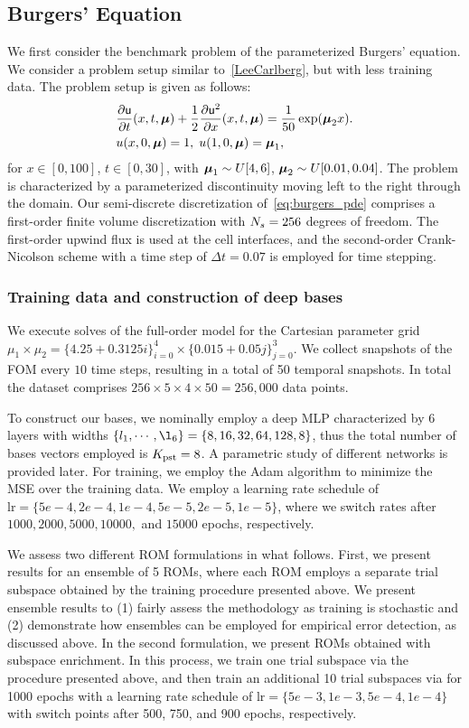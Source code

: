 \documentclass[3p,computermodern,10pt]{elsarticle}
\begin{document}
\subsection{Burgers' Equation}
We first consider the benchmark problem of the parameterized Burgers' equation. We consider a problem setup similar to~\ref{LeeCarlberg}, but with less training data. The problem setup is given as follows: 
\begin{align*}\label{eq:burgers_pde}
&\frac{\partial \mathsf{u}}{\partial t}(x,t,\boldsymbol \mu) + \frac{1}{2} \frac{\partial \mathsf{u}^2}{\partial x}(x,t,\boldsymbol \mu) = \frac{1}{50} \exp(\boldsymbol \mu_2 x). \\
&u(x,0,\boldsymbol \mu) = 1, \; u(1,0,\boldsymbol \mu) = \boldsymbol \mu_1,
\end{align*}
for $x \in [0,100]$, $t \in [0,30]$, with $\boldsymbol \mu_1 \sim U[4,6]$, $\boldsymbol \mu_2 \sim U[0.01,0.04]$.
The problem is characterized by a parameterized discontinuity moving left to the right through the domain. Our semi-discrete discretization of~\eqref{eq:burgers_pde} comprises a first-order finite volume discretization with $N_s=256$ degrees of freedom. The first-order upwind flux is used at the cell interfaces, and the second-order Crank-Nicolson scheme with a time step of $\Delta t = 0.07$ is employed for time stepping.

\subsubsection{Training data and construction of deep bases} 
We execute solves of the full-order model for the Cartesian parameter grid $\mu_1 \times \mu_2 = \{ 4.25 + 0.3125 i \}_{i=0}^4 \times \{ 0.015 + 0.05 j \}_{j=0}^3$. We collect snapshots of the FOM every $10$ time steps, resulting in a total of 50 temporal snapshots. In total the dataset comprises $256 \times 5 \times 4 \times 50 = 256,000$ data points. 

To construct our bases, we nominally employ a deep MLP characterized by 6 layers with widths $\{l_1,\cdots,\l_6\} = \{8,16,32,64,128,8\}$, thus the total number of bases vectors employed is $K_{\text{pst}} = 8$. A parametric study of different networks is provided later. For training, we employ the Adam algorithm to minimize the MSE over the training data. We employ a learning rate schedule of $\text{lr} = \{5e-4,2e-4,1e-4,5e-5,2e-5,1e-5 \}$, where we switch rates after $1000,2000,5000,10000,$ and $15000$ epochs, respectively. 

We assess two different ROM formulations in what follows. First, we present results for an ensemble of 5 ROMs, where each ROM employs a separate trial subspace obtained by the training procedure presented above. We present ensemble results to (1) fairly assess the methodology as training is stochastic and (2) demonstrate how ensembles can be employed for empirical error detection, as discussed above. In the second formulation, we present ROMs obtained with subspace enrichment. In this process, we train one trial subspace via the procedure presented above, and then train an additional 10 trial subspaces via for 1000 epochs with a learning rate schedule of $\text{lr} = \{5e-3,1e-3,5e-4,1e-4\}$ with switch points after 500, 750, and 900 epochs, respectively.  
\end{document}

